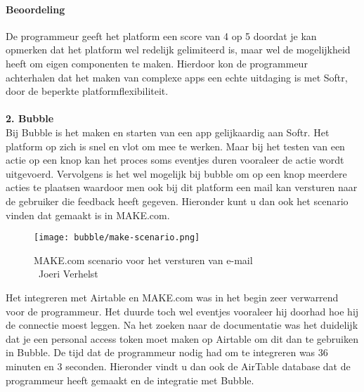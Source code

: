 \paragraph*{Beoordeling}
De programmeur geeft het platform een score van 4 op 5 doordat je kan opmerken dat het platform wel redelijk gelimiteerd is, maar wel de mogelijkheid heeft om eigen componenten te maken. 
Hierdoor kon de programmeur achterhalen dat het maken van complexe apps een echte uitdaging is met Softr, 
door de beperkte platformflexibiliteit.
\\
\\
\textbf{2. Bubble}
\\
Bij Bubble is het maken en starten van een app gelijkaardig aan Softr. Het platform op zich is snel en vlot om mee te werken. Maar bij het testen van een actie op een knop
kan het proces soms eventjes duren vooraleer de actie wordt uitgevoerd. Vervolgens is het wel mogelijk bij bubble om op een knop meerdere acties te plaatsen waardoor men ook 
bij dit platform een mail kan versturen naar de gebruiker die feedback heeft gegeven. Hieronder kunt u dan ook het scenario vinden dat gemaakt is in MAKE.com.
\\
\begin{figure}[H]
    \texttt{[image: bubble/make-scenario.png]}
    \caption[MAKE.com scenario voor het versturen van e-mail]{MAKE.com scenario voor het versturen van e-mail\\\textcopyright\ Joeri Verhelst}
    \label{fig:make-scenario-bubble}
\end{figure}
Het integreren met Airtable en MAKE.com was in het begin zeer verwarrend voor de programmeur. Het duurde toch wel eventjes vooraleer hij doorhad hoe hij de connectie moest leggen.
Na het zoeken naar de documentatie was het duidelijk dat je een personal access token moet maken op Airtable om dit dan te gebruiken in Bubble. De tijd dat de programmeur nodig had 
om te integreren was 36 minuten en 3 seconden. Hieronder vindt u dan ook de AirTable database dat de programmeur heeft gemaakt en de integratie met Bubble.
\\
\\


